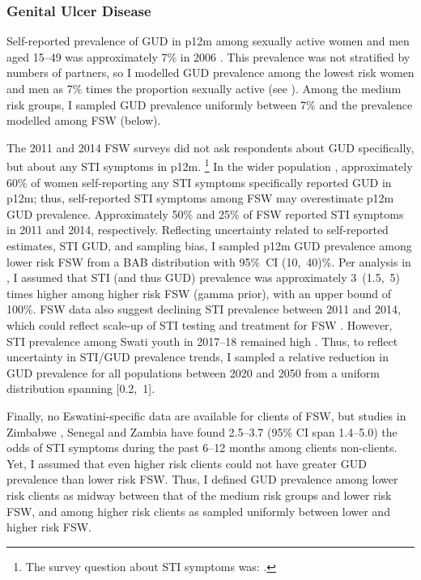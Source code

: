 \subsubsection{Genital Ulcer Disease}\label{model.par.tm.gud}
Self-reported prevalence of GUD in p12m among sexually active women and men aged 15--49
was approximately 7\% in 2006 \cite[Table~13.14]{SDHS2006}.
This prevalence was not stratified by numbers of partners,
so I modelled GUD prevalence among the lowest risk women and men as
7\% times the proportion sexually active (see ). %
Among the medium risk groups, I sampled GUD prevalence uniformly between
7\% and the prevalence modelled among FSW (below).
\par
The 2011 and 2014 FSW surveys did not ask respondents about GUD specifically,
but about any STI symptoms in p12m.%
\footnote{The survey question about STI symptoms was:
  .}
In the wider population \cite{SDHS2006},
approximately 60\% of women self-reporting any STI symptoms specifically reported GUD in p12m;
thus, self-reported STI symptoms among FSW may overestimate p12m GUD prevalence.
Approximately 50\% and 25\% of FSW reported STI symptoms in 2011 and 2014, respectively.
Reflecting uncertainty related to self-reported estimates, STI \vs GUD, and sampling bias,
I sampled p12m GUD prevalence among lower risk FSW from
a BAB distribution with 95\%~CI (10,~40)\%.
Per analysis in , I assumed that STI (and thus GUD) prevalence was
approximately 3~(1.5,~5) times higher among higher risk FSW (gamma prior),
with an upper bound of 100\%.
FSW data also suggest declining STI prevalence between 2011 and 2014,
which could reflect scale-up of STI testing and treatment for FSW \cite{NERCHA2012}.
However, STI prevalence among Swati youth in 2017--18 remained high \cite{Jasumback2020}.
Thus, to reflect uncertainty in STI/GUD prevalence trends,
I sampled a relative reduction in GUD prevalence for all populations between 2020 and 2050
from a uniform distribution spanning [0.2,~1].
\par
Finally, no Eswatini-specific data are available for clients of FSW,
but studies in Zimbabwe \cite{Cowan2005}, Senegal \cite{Santo2005} and Zambia \cite{Carrasco2020}
have found 2.5--3.7 (95\% CI span 1.4--5.0) the odds
of STI symptoms during the past 6--12 months among clients \vs non-clients.
Yet, I assumed that even higher risk clients
could not have greater GUD prevalence than lower risk FSW.
Thus, I defined GUD prevalence among lower risk clients as
midway between that of the medium risk groups and lower risk FSW, and
among higher risk clients as sampled uniformly between lower and higher risk FSW.
